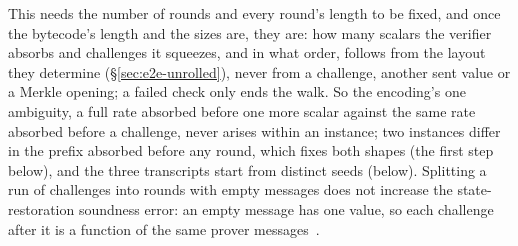 This needs the number of rounds and every round's length to be fixed, and once the bytecode's length and the sizes are, they are: how many scalars the verifier absorbs and challenges it squeezes, and in what order, follows from the layout they determine (\S\ref{sec:e2e-unrolled}), never from a challenge, another sent value or a Merkle opening; a failed check only ends the walk. So the encoding's one ambiguity, a full rate absorbed before one more scalar against the same rate absorbed before a challenge, never arises within an instance; two instances differ in the prefix absorbed before any round, which fixes both shapes (the first step below), and the three transcripts start from distinct seeds (below). Splitting a run of challenges into rounds with empty messages does not increase the state-restoration soundness error: an empty message has one value, so each challenge after it is a function of the same prover messages~\cite[Definition~3.12]{CO25}.

